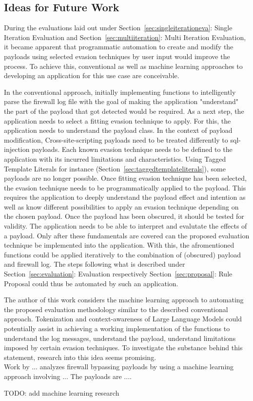 \subsection{Ideas for Future Work}
During the evaluations laid out under Section~\ref{sec:singleiterationeva}: Single Iteration Evaluation and Section~\ref{sec:multiiteration}: Multi Iteration Evaluation, it became apparent that programmatic automation to create and modify the payloads using selected evasion techniques by user input would improve the process. To achieve this, conventional as well as machine learning approaches to developing an application for this use case are conceivable.

In the conventional approach, initially implementing functions to intelligently parse the firewall log file with the goal of making the application "understand" the part of the payload that got detected would be required. As a next step, the application needs to select a fitting evasion technique to apply. For this, the application needs to understand the payload class. In the context of payload modification, Cross-site-scripting payloads need to be treated differently to sql-injection payloads. Each known evasion technique needs to be defined to the application with its incurred limitations and characteristics. Using Tagged Template Literals for instance (Section~\ref{sec:taggedtemplateliterals}), some payloads are no longer possible.
Once fitting evasion technique has been selected, the evasion technique needs to be programmatically applied to the payload. This requires the application to deeply understand the payload effect and intention as well as know different possibilities to apply an evasion technique depending on the chosen payload. Once the payload has been obscured, it should be tested for validity. The application needs to be able to interpret and evalutate the effects of a payload. Only after these fundamentals are covered can the proposed evaluation technique be implemented into the application. With this, the afromentioned functions could be applied iteratively to the combination of (obscured) payload and firewall log. The steps following what is described under Section~\ref{sec:evaluation}: Evaluation respectively Section~\ref{sec:proposal}: Rule Proposal could thus be automated by such an application.

The author of this work considers the machine learning approach to automating the proposed evaluation methodology similar to the described conventional approach. Tokenization and context-awareness of Large Language Models could potentially assist in achieving a working implementation of the functions to understand the log messages, understand the payload, understand limitations imposed by certain evasion techniques. To investigate the substance behind this statement, research into this idea seems promising. \\
Work by ...  analyzes firewall bypassing payloads by using a machine learning approach involving ... The payloads are ....

	{\color{red} TODO: add machine learning research}
